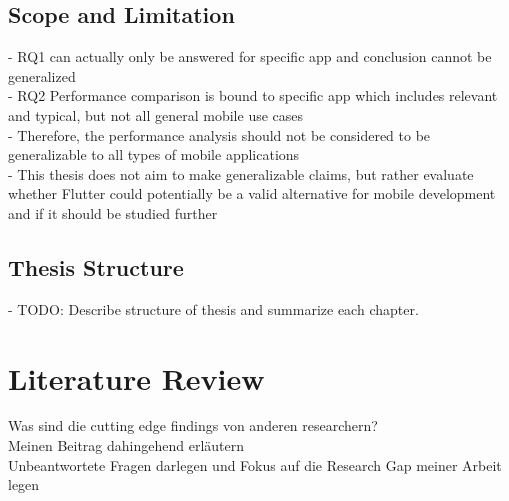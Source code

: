 \section{Scope and Limitation}
- RQ1 can actually only be answered for specific app and conclusion cannot be generalized\\
- RQ2 Performance comparison is bound to specific app which includes relevant and typical, but not all general mobile use cases\\
- Therefore, the performance analysis should not be considered to be generalizable to all types of mobile applications\\
- This thesis does not aim to make generalizable claims, but rather evaluate whether Flutter could potentially be a valid alternative for mobile development and if it should be studied further\\

\section{Thesis Structure}
- TODO: Describe structure of thesis and summarize each chapter.


\chapter{Literature Review}

Was sind die cutting edge findings von anderen researchern? \\
Meinen Beitrag dahingehend erläutern \\
Unbeantwortete Fragen darlegen und Fokus auf die Research Gap meiner Arbeit legen

